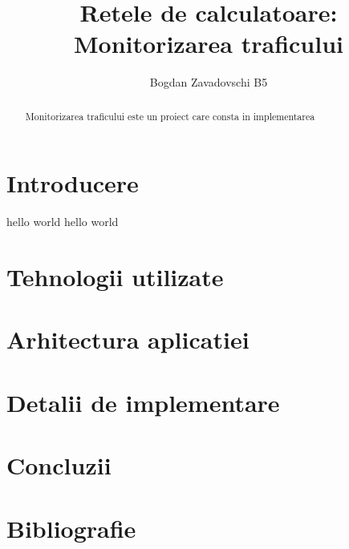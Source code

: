 \documentclass{article}
\author{Bogdan Zavadovschi B5}
\title{
    Retele de calculatoare: \protect\\ 
    Monitorizarea traficului
    }
\begin{document}
\maketitle
\begin{abstract}
    Monitorizarea traficului este un proiect care consta in implementarea 
\end{abstract}
\section{Introducere}
hello world
hello world
\section{Tehnologii utilizate}
\section{Arhitectura aplicatiei}
\section{Detalii de implementare}
\section{Concluzii}
\section{Bibliografie}
\end{document}
